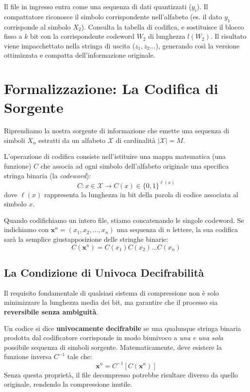 \vspace{0.5cm}

Il file in ingresso entra come una sequenza di dati quantizzati ($y_i$). Il compattatore riconosce il simbolo corrispondente nell'alfabeto (es. il dato $y_1$ corrisponde al simbolo $X_2$). Consulta la tabella di codifica, e sostituisce il blocco fisso a $k$ bit con la corrispondente codeword $W_2$ di lunghezza $l(W_2)$. Il risultato viene impacchettato nella stringa di uscita ($z_1, z_2 \dots$), generando così la versione ottimizzata e compatta dell'informazione originale.

\section{Formalizzazione: La Codifica di Sorgente}

Riprendiamo la nostra sorgente di informazione che emette una sequenza di simboli $X_n$ estratti da un alfabeto $\mathcal{X}$ di cardinalità $|\mathcal{X}| = M$. 

L'operazione di codifica consiste nell'istituire una mappa matematica (una funzione) $C$ che associa ad ogni simbolo dell'alfabeto originale una specifica stringa binaria (la \textit{codeword}):
\begin{equation}
C : x \in \mathcal{X} \longrightarrow C(x) \in \{0,1\}^{\ell(x)}
\end{equation}
dove $\ell(x)$ rappresenta la lunghezza in bit della parola di codice associata al simbolo $x$.

Quando codifichiamo un intero file, stiamo concatenando le singole codeword. Se indichiamo con $\mathbf{x}^n = (x_1, x_2, \dots, x_n)$ una sequenza di $n$ lettere, la sua codifica sarà la semplice giustapposizione delle stringhe binarie:
\begin{equation}
C(\mathbf{x}^n) = C(x_1)C(x_2)\dots C(x_n)
\end{equation}

\subsection{La Condizione di Univoca Decifrabilità}
Il requisito fondamentale di qualsiasi sistema di compressione non è solo minimizzare la lunghezza media dei bit, ma garantire che il processo sia \textbf{reversibile senza ambiguità}. 

Un codice si dice \textbf{univocamente decifrabile} se una qualunque stringa binaria prodotta dal codificatore corrisponde in modo biunivoco a \textit{una e una sola} possibile sequenza di simboli sorgente. Matematicamente, deve esistere la funzione inversa $C^{-1}$ tale che:
\begin{equation}
\mathbf{x}^n = C^{-1}[C(\mathbf{x}^n)]
\end{equation}
Senza questa proprietà, il file decompresso potrebbe risultare diverso da quello originale, rendendo la compressione inutile.

